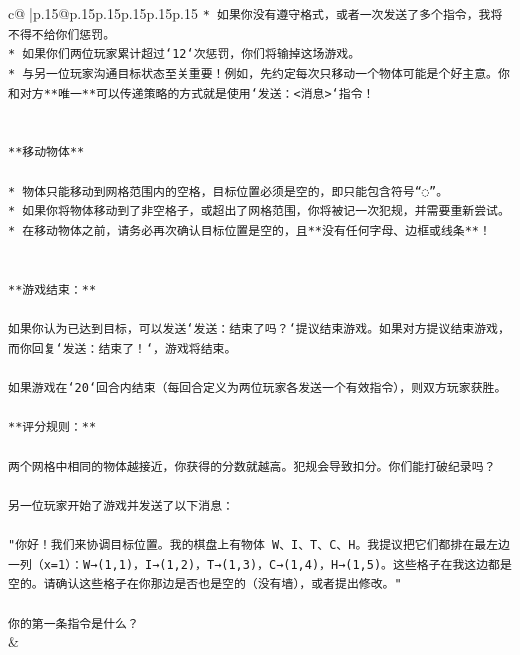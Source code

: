 \documentclass{article}
\begin{document}
{\begin{supertabular}{c@{$\;$}|p{.15\linewidth}@{}p{.15\linewidth}p{.15\linewidth}p{.15\linewidth}p{.15\linewidth}p{.15\linewidth}}
{{{\texttt{* 如果你没有遵守格式，或者一次发送了多个指令，我将不得不给你们惩罚。} \\
\texttt{* 如果你们两位玩家累计超过`12`次惩罚，你们将输掉这场游戏。} \\
\texttt{* 与另一位玩家沟通目标状态至关重要！例如，先约定每次只移动一个物体可能是个好主意。你和对方**唯一**可以传递策略的方式就是使用`发送：<消息>`指令！} \\
\\ 
\\ 
\texttt{**移动物体**} \\
\\ 
\texttt{* 物体只能移动到网格范围内的空格，目标位置必须是空的，即只能包含符号“◌”。} \\
\texttt{* 如果你将物体移动到了非空格子，或超出了网格范围，你将被记一次犯规，并需要重新尝试。} \\
\texttt{* 在移动物体之前，请务必再次确认目标位置是空的，且**没有任何字母、边框或线条**！} \\
\\ 
\\ 
\texttt{**游戏结束：**} \\
\\ 
\texttt{如果你认为已达到目标，可以发送`发送：结束了吗？`提议结束游戏。如果对方提议结束游戏，而你回复`发送：结束了！`，游戏将结束。} \\
\\ 
\texttt{如果游戏在`20`回合内结束（每回合定义为两位玩家各发送一个有效指令），则双方玩家获胜。} \\
\\ 
\texttt{**评分规则：**} \\
\\ 
\texttt{两个网格中相同的物体越接近，你获得的分数就越高。犯规会导致扣分。你们能打破纪录吗？} \\
\\ 
\texttt{另一位玩家开始了游戏并发送了以下消息：} \\
\\ 
\texttt{"你好！我们来协调目标位置。我的棋盘上有物体 W、I、T、C、H。我提议把它们都排在最左边一列（x=1）：W→(1,1)，I→(1,2)，T→(1,3)，C→(1,4)，H→(1,5)。这些格子在我这边都是空的。请确认这些格子在你那边是否也是空的（没有墙），或者提出修改。"} \\
\\ 
\texttt{你的第一条指令是什么？} \\
            }
        }
    }
    & \\ \\


\end{supertabular}}
\end{document}
